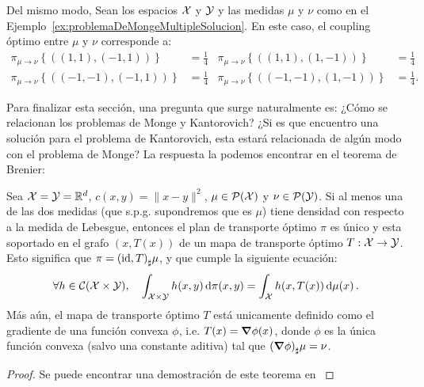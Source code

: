 {{\begin{example}
	  \end{example}

	  \begin{example}
		  Del mismo modo, Sean los espacios $\cX$ y $\cY$ y las medidas $\mu$ y $\nu$ como en el Ejemplo~\ref*{ex:problemaDeMongeMultipleSolucion}. En este caso, el coupling óptimo entre $\mu$ y $\nu$ corresponde a:
		  \begin{align*}
			  \pi_{\mu \to \nu}\left\{ ((1, 1), (-1, 1)) \right\}   & = \frac{1}{4} & \pi_{\mu \to \nu}\left\{ ((1, 1), (1, -1)) \right\}   & = \frac{1}{4}  \\
			  \pi_{\mu \to \nu}\left\{ ((-1, -1), (-1, 1)) \right\} & = \frac{1}{4} & \pi_{\mu \to \nu}\left\{ ((-1, -1), (1, -1)) \right\} & = \frac{1}{4}.
		  \end{align*}

	  \end{example}

	  Para finalizar esta sección, una pregunta que surge naturalmente es: ¿Cómo se relacionan los problemas de Monge y Kantorovich? ¿Si es que encuentro una solución para el problema de Kantorovich, esta estará relacionada de algún modo con el problema de Monge?
	  La respuesta la podemos encontrar en el teorema de Brenier:

	  \begin{theorem}
		  Sea $\cX = \cY = \R^d$, $c(x, y) = \|x - y\|^2$, $\mu\in \ProbSpace[\cX] $ y $\nu\in \ProbSpace[\cY] $. Si al menos una de las dos medidas (que s.p.g. supondremos que es $\mu$) tiene densidad con respecto a la medida de Lebesgue, entonces el plan de transporte óptimo $\pi$ es único y esta soportado en el grafo $(x, T(x))$ de un mapa de transporte óptimo $T:\cX \to \cY$. Esto significa que $\pi = \pf{(\id, T)}\mu$, y que cumple la siguiente ecuación:
		  \begin{equation}
			  \forall h \in \cC(\cX \times \cY),\quad \int_{\cX\times\cY}^{} h(x, y) \dpi[x, y] = \int_{\cX}^{} h(x, T(x)) \dmu[x].
		  \end{equation}
		  Más aún, el mapa de transporte óptimo $T$ está unicamente definido como el gradiente de una función convexa $\phi$, i.e. $T(x) = \grad \phi(x)$, donde $\phi$ es la única función convexa (salvo una constante aditiva) tal que $\pf{(\grad \phi)} \mu = \nu$.
	  \end{theorem}

	  \begin{proof}
		  Se puede encontrar una demostración de este teorema en \cite[p. 27]{peyre2019computational}
	  \end{proof}


}}

